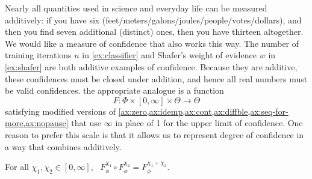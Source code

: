 


Nearly all quantities used in science 
and everyday life
can be measured additively:
if you have six (feet/meters/galons/joules/people/votes/dollars), 
and then you find seven additional (distinct) ones, then you have thirteen altogether. 
We would like a measure of confidence that also works this way.
The number of training iterations $n$ in \cref{ex:classifier}
and Shafer's weight of evidence $w$ in \cref{ex:shafer}
are both additive examples of confidence.
Because they are additive,
these confidences must be closed under addition, and hence
all real numbers must be valid confidences.
the appropriate analogue is a function
\begin{equation}
	F : \Phi \times [0, \infty] \times \Theta \to \Theta
	\label{eq:zero-inf-form}
\end{equation}
satisfying modified versions of
\cref{ax:zero,ax:idemp,ax:cont,ax:diffble,ax:seq-for-more,ax:nopause}
that use $\infty$ in place of 1 for the upper limit of confidence. 
One reason to prefer this scale is that it 
allows us to represent degree of confidence in a way that combines additively. 


\begin{CFaxioms}
	\item For all
		$\chi_1, \chi_2 \in [0,\infty]$,~
		$F^{\chi_1}_\phi \circ F^{\chi_2}_\phi = F^{\chi_1 + \chi_2}_\phi$.
		\label{ax:additivity}
\end{CFaxioms}

